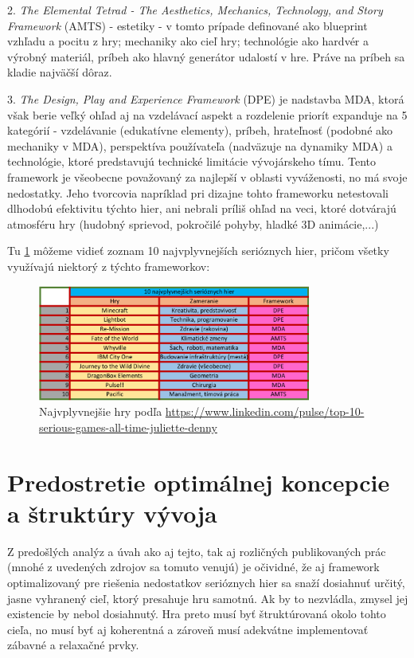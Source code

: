 \documentclass[10pt,twoside,slovak,a4paper]{article}
\begin{document}
2. \emph{The Elemental Tetrad - The Aesthetics, Mechanics, Technology, and Story Framework} (AMTS) - estetiky - v tomto prípade definované ako blueprint vzhľadu a pocitu z hry; mechaniky ako cieľ hry; technológie ako hardvér a výrobný materiál, príbeh ako hlavný generátor udalostí v hre. Práve na príbeh sa kladie najväčší dôraz.

3. \emph{The Design, Play and Experience Framework} (DPE) je nadstavba MDA, ktorá však berie veľký ohľad aj na vzdelávací aspekt a rozdelenie priorít expanduje na 5 kategórií - vzdelávanie (edukatívne elementy), príbeh, hrateľnosť (podobné ako mechaniky v MDA), perspektíva používateľa (nadväzuje na dynamiky MDA) a technológie, ktoré predstavujú technické limitácie vývojárskeho tímu. Tento framework je všeobecne považovaný za najlepší v oblasti vyváženosti, no má svoje nedostatky. Jeho tvorcovia napríklad pri dizajne tohto frameworku netestovali dlhodobú efektivitu týchto hier, ani nebrali príliš ohľad na veci, ktoré dotvárajú atmosféru hry (hudobný sprievod, pokročilé pohyby, hladké 3D animácie,...)

Tu \ref{fig:table} môžeme vidieť zoznam 10 najvplyvnejších serióznych hier, pričom všetky využívajú niektorý z týchto frameworkov:
\begin{figure}[h]
\centering
\includegraphics[width = 0.8\textwidth]{uspesne_ser_hry.pdf}
\caption{Najvplyvnejšie hry podľa \url{https://www.linkedin.com/pulse/top-10-serious-games-all-time-juliette-denny}}
\label{fig:table}
\end{figure}

\section{Predostretie optimálnej koncepcie a štruktúry vývoja} \label{riesenie}
Z predošlých analýz a úvah ako aj tejto, tak aj rozličných publikovaných prác (mnohé z uvedených zdrojov sa tomuto venujú) je očividné, že aj framework optimalizovaný pre riešenia nedostatkov serióznych hier sa snaží dosiahnuť určitý, jasne vyhranený cieľ, ktorý presahuje hru samotnú. Ak by to nezvládla, zmysel jej existencie by nebol dosiahnutý. Hra preto musí byť štruktúrovaná okolo tohto cieľa, no musí byť aj koherentná a zároveň musí adekvátne implementovať zábavné a relaxačné prvky.
\end{document}
